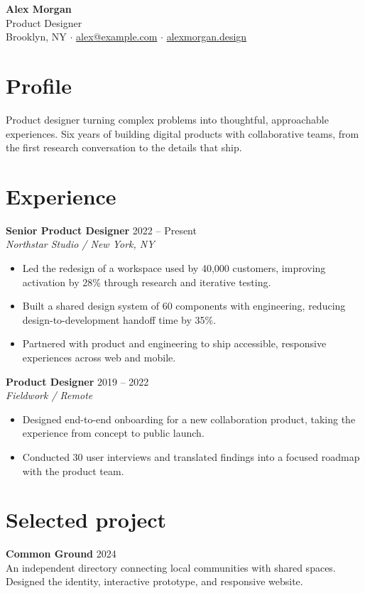 \documentclass[11pt,a4paper]{article}
\begin{document}
\color{ink}

{\Huge\bfseries Alex Morgan}\\[5pt]
{\large Product Designer}\\[7pt]
\small
Brooklyn, NY \enspace $\cdot$ \enspace
\href{mailto:alex@example.com}{alex@example.com} \enspace $\cdot$ \enspace
\href{https://example.com}{alexmorgan.design}
\normalsize

\section{Profile}
Product designer turning complex problems into thoughtful, approachable
experiences. Six years of building digital products with collaborative teams,
from the first research conversation to the details that ship.

\section{Experience}
\textbf{Senior Product Designer} \hfill 2022 -- Present\\
\textit{Northstar Studio \enspace / \enspace New York, NY}
\begin{itemize}
  \item Led the redesign of a workspace used by 40,000 customers,
        improving activation by 28\% through research and iterative testing.
  \item Built a shared design system of 60 components with engineering,
        reducing design-to-development handoff time by 35\%.
  \item Partnered with product and engineering to ship accessible,
        responsive experiences across web and mobile.
\end{itemize}

\textbf{Product Designer} \hfill 2019 -- 2022\\
\textit{Fieldwork \enspace / \enspace Remote}
\begin{itemize}
  \item Designed end-to-end onboarding for a new collaboration product,
        taking the experience from concept to public launch.
  \item Conducted 30 user interviews and translated findings into a
        focused roadmap with the product team.
\end{itemize}

\section{Selected project}
\textbf{Common Ground} \hfill 2024\\
An independent directory connecting local communities with shared spaces.
Designed the identity, interactive prototype, and responsive website.
\end{document}
